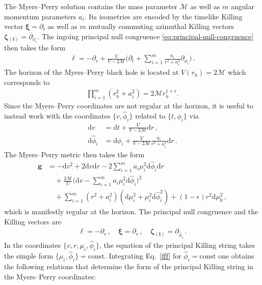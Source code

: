 \documentclass[superscriptaddress,twocolumn,showpacs,
preprintnumbers,amsmath,amssymb,nofootinbib,
longbibliography,aps,prd,10pt]{revtex4-1}
\newcommand{\ts}[1]{{\boldsymbol{#1}}}         %
\newcommand{\dd}{\mbox{d}}
\newcommand{\n}[1]{\label{#1}}
\begin{document}
The Myers--Perry solution contains  the mass parameter $\mathcal{M}$ as well as $m$ angular momentum parameters $a_i$. Its isometries are encoded by the timelike Killing vector $\ts{\xi} = \partial_t$ as well as $m$ mutually commuting azimuthal Killing vectors $\ts{\zeta{}_{(i)}} = \partial_{\phi_i}$. The ingoing principal null congruence \eqref{eq:principal-null-congruence} then takes the form
\begin{align}
\ts{\ell} = - \partial_r + \frac{V}{V - 2\mathcal{M}} \bigg( \partial_t  + \sum\limits_{i=1}^m \frac{a_i}{r^2 + a_i^2} \partial_{\phi_i} \bigg) \, . \label{eq:myers-perry-pnc}
\end{align}
The horizon of the Myers--Perry black hole is located at $V(r_h) = 2\mathcal{M}$ which corresponds to
\begin{align}
\prod\limits_{i=1}^m (r_h^2 + a_i^2) = 2\mathcal{M} r_h^{1+\epsilon} .
\end{align}
Since the Myers--Perry coordinates are not regular at the horizon, it is useful to instead work with the coordinates $\{v, \hat{\phi}_i\}$ related to $\{t, \phi_i\}$ via
\begin{align}
\dd v &= \dd t + \frac{V}{V-2\mathcal{M}} \dd r \, , \\
\dd \hat{\phi}_i &= \dd \phi_i + \frac{V}{V-2\mathcal{M}} \frac{a_i}{r^2 + a_i^2} \dd r \, .\n{fff}
\end{align}
The Myers--Perry metric then takes the form
\begin{align}
\label{eq:mp-regular-ingoing}
\ts{g} &= - \dd v^2 + 2 \dd v \dd r - 2 \sum\limits_{i=1}^m a_i \mu_i^2 \dd \hat{\phi}_i \dd r \nonumber \\
&\hspace{12pt} + \frac{2\mathcal{M}}{U} \bigg( \dd v - \sum\limits_{i=1}^m a_i \mu_i^2 \dd \hat{\phi}_i \bigg)^2  \\
&\hspace{12pt}+ \sum\limits_{i=1}^m \left( r^2 + a_i^2 \right)\left( \dd \mu_i^2 + \mu_i^2 \dd \hat{\phi}_i^2 \right) + (1 - \epsilon)r^2 \dd \mu_0^2 \, , \nonumber
\end{align}
which is manifestly regular at the horizon. The principal null congruence and the Killing vectors are
\begin{align}
\label{eq:mp-pnc-killing-vectors}
\ts{\ell} = -\partial_r \, , \quad \ts{\xi} = \partial_v \, , \quad \ts{\zeta{}_{(i)}} = \partial{}_{\hat{\phi}_i} \, .
\end{align}
In the coordinates $\{ v,r,\mu_i,\hat{\phi}_i \}$, the equation of the principal Killing string takes the simple form $\{\mu_i,\hat{\phi}_i\}= \text{const}$. Integrating Eq.~\eqref{fff} for $\hat{\phi}_i=\text{const}$ one obtains the following relations that determine the form of the principal Killing string in the Myers--Perry coordinates:
\end{document}
